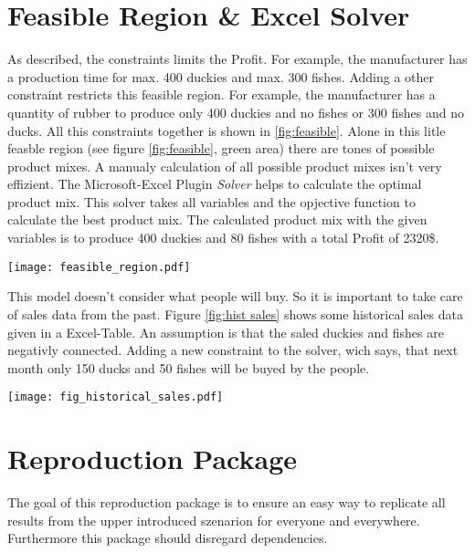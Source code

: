 \documentclass{article}
\begin{document}
\begin{multicols}{2}
\section{Feasible Region \& Excel Solver}
As described, the constraints limits the Profit. For example, the manufacturer has a production time for max. 400 duckies and max. 300 fishes. Adding a other constraint restricts this feasible region. For example, the manufacturer has a quantity of rubber to produce only 400 duckies and no fishes or 300 fishes and no ducks. All this constraints together is shown in \ref{fig:feasible}. Alone in this litle feasble region (see figure \ref{fig:feasible}, green area) there are tones of possible product mixes. A manualy calculation of all possible product mixes isn't very effizient. The Microsoft-Excel Plugin \textit{Solver} \cite{microsoft} helps to calculate the optimal product mix. This solver takes all variables and the opjective function to calculate the best product mix. The calculated product mix with the given variables is to produce 400 duckies and 80 fishes with a total Profit of 2320\$.

\begin{center}
\texttt{[image: feasible\_region.pdf]}
\label{fig:feasible}
\end{center}

This model doesn't consider what people will buy. So it is important to take care of sales data from the past. Figure \ref{fig:hist sales} shows some historical sales data given in a Excel-Table. An assumption is that the saled duckies and fishes are negativly connected. Adding a new constraint to the solver, wich says, that next month only 150 ducks and 50 fishes will be buyed by the people.


\begin{center}
\texttt{[image: fig\_historical\_sales.pdf]}
\label{fig:hist sales}
\end{center}

\section{Reproduction Package}
The goal of this reproduction package is to ensure an easy way to replicate all results from the upper introduced szenarion for everyone and everywhere. Furthermore this package should disregard dependencies.


\end{multicols}
\end{document}
